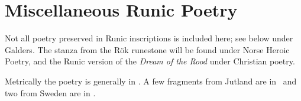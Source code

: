\part{Miscellaneous Runic Poetry}


Not all poetry preserved in Runic inscriptions is included here; see below under Galders.  The stanza from the Rök runestone will be found under Norse Heroic Poetry, and the Runic version of the \emph{Dream of the Rood} under Christian poetry.

Metrically the poetry is generally in \Fornyrdislag.  A few fragments from Jutland are in \Ljodahattr\ and two from Sweden are in \Drottkvett.





% 





% 


% 


% 
